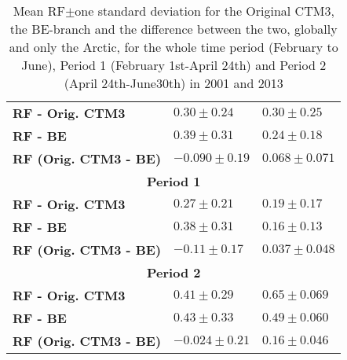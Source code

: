 \begin{table}[h]
\begin{tabular}{|l|l|l|}
\textbf{RF - Orig. CTM3}      & $0.30\pm0.24$                         & $0.30\pm0.25$                        \\
\textbf{RF - BE}              & $0.39\pm0.31$                         & $0.24\pm0.18$                        \\
\textbf{RF (Orig. CTM3 - BE)} & $-0.090\pm0.19$                       & $0.068\pm0.071$                      \\ \hline
\multicolumn{3}{|c|}{\textbf{Period 1}}                                                                      \\ \hline
\textbf{RF - Orig. CTM3}      & $0.27\pm0.21$                         & $0.19\pm0.17$                        \\
\textbf{RF - BE}              & $0.38\pm0.31$                         & $0.16\pm0.13$                        \\
\textbf{RF (Orig. CTM3 - BE)} & $-0.11\pm0.17$                        & $0.037\pm0.048$                      \\ \hline
\multicolumn{3}{|c|}{\textbf{Period 2}}                                                                      \\ \hline
\textbf{RF - Orig. CTM3}      & $0.41\pm0.29$                         & $0.65\pm0.069$                       \\
\textbf{RF - BE}              & $0.43\pm0.33$                         & $0.49\pm0.060$                       \\
\textbf{RF (Orig. CTM3 - BE)} & $-0.024\pm0.21$                       & $0.16\pm0.046$                       \\ \hline
\end{tabular}
\caption{Mean RF$\pm$one standard deviation for the Original CTM3, the BE-branch and the difference between the two, globally and only the Arctic, for the whole time period (February to June), Period 1 (February 1st-April 24th) and Period 2 (April 24th-June30th) in 2001 and 2013}
\label{tab:RF_results}
\end{table}